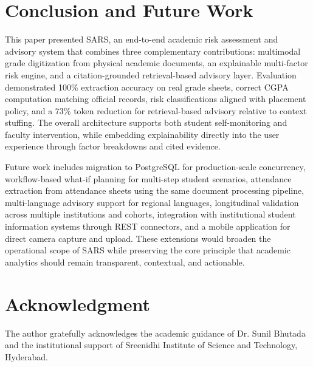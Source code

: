 \documentclass[conference]{IEEEtran}
\begin{document}
\section{Conclusion and Future Work}
This paper presented SARS, an end-to-end academic risk assessment and advisory system that combines three complementary contributions: multimodal grade digitization from physical academic documents, an explainable multi-factor risk engine, and a citation-grounded retrieval-based advisory layer. Evaluation demonstrated 100\% extraction accuracy on real grade sheets, correct CGPA computation matching official records, risk classifications aligned with placement policy, and a 73\% token reduction for retrieval-based advisory relative to context stuffing. The overall architecture supports both student self-monitoring and faculty intervention, while embedding explainability directly into the user experience through factor breakdowns and cited evidence.

Future work includes migration to PostgreSQL for production-scale concurrency, workflow-based what-if planning for multi-step student scenarios, attendance extraction from attendance sheets using the same document processing pipeline, multi-language advisory support for regional languages, longitudinal validation across multiple institutions and cohorts, integration with institutional student information systems through REST connectors, and a mobile application for direct camera capture and upload. These extensions would broaden the operational scope of SARS while preserving the core principle that academic analytics should remain transparent, contextual, and actionable.

\section*{Acknowledgment}
The author gratefully acknowledges the academic guidance of Dr. Sunil Bhutada and the institutional support of Sreenidhi Institute of Science and Technology, Hyderabad.
\end{document}
